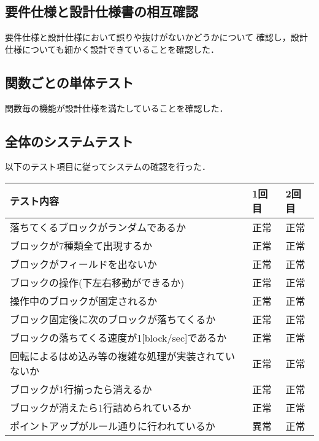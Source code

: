 \subsection{要件仕様と設計仕様書の相互確認}
要件仕様と設計仕様において誤りや抜けがないかどうかについて
確認し，設計仕様についても細かく設計できていることを確認した．
\subsection{関数ごとの単体テスト}
関数毎の機能が設計仕様を満たしていることを確認した．
\subsection{全体のシステムテスト}
以下のテスト項目に従ってシステムの確認を行った．
\begin{table}[htb]
\begin{tabular}{|l|l|l|}
\hline
テスト内容                             & 1回目 & 2回目 \\ \hline
落ちてくるブロックがランダムであるか                & 正常  & 正常  \\ \hline
ブロックが7種類全て出現するか                   & 正常  & 正常  \\ \hline
ブロックがフィールドを出ないか                   & 正常  & 正常  \\ \hline
ブロックの操作(下左右移動ができるか)               & 正常  & 正常  \\ \hline
操作中のブロックが固定されるか                   & 正常  & 正常  \\ \hline
ブロック固定後に次のブロックが落ちてくるか             & 正常  & 正常  \\ \hline
ブロックの落ちてくる速度が1{[}block/sec{]}であるか & 正常  & 正常  \\ \hline
回転によるはめ込み等の複雑な処理が実装されていないか        & 正常  & 正常  \\ \hline
ブロックが1行揃ったら消えるか                   & 正常  & 正常  \\ \hline
ブロックが消えたら1行詰められているか               & 正常  & 正常  \\ \hline
ポイントアップがルール通りに行われているか             & 異常  & 正常  \\ \hline
\end{tabular}
\end{table}
